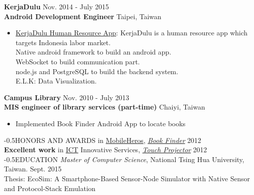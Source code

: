 \documentclass{res}
\makeatletter
\renewcommand{\section}{\@startsection{section}{1}{0mm}
  {-\baselineskip}{0.5\baselineskip}{\bf\leftline}}
\makeatother
\begin{document}
\begin{resume}
	 			{\bf KerjaDulu }                                {\hfill  Nov. 2014 - July 2015}\\
				{\bf Android Development Engineer}			    	 {\hfill Taipei, Taiwan}
		
				\begin{itemize}[leftmargin=*]
					\item {\href{https://www.techinasia.com/kerjadulu-funding-mnc-group}{KerjaDulu Human Resource App}}:
					KerjaDulu is a human resource app which targets Indonesia labor market.\\
					Native android framework to build an android app.\\
					WebSocket to build communication part.\\
					node.js and PostgreSQL to build the backend system.\\
					E.L.K: Data Visualization.
				\end{itemize}
				\vspace{-0.12in}

				{\bf Campus Library}                            {\hfill  Nov. 2010 - July 2013}\\
				{\bf MIS engineer of library services (part-time)}            {\hfill Chaiyi, Taiwan}
				\begin{itemize}[leftmargin=*]
					\item Implemented B​ook Finder Android App to locate books
				\end{itemize}

			\vspace{-0.20in}
			\section{HONORS AND AWARDS}  
			    \vspace{-0.25in}
				 in \href{https://www.mobilehero.com/component/k2/item/209-a2012_11-10.html?Itemid=196}{MobileHeros}, \href{https://www.youtube.com/watch?v=BvLKtrgq_yw}{\sl B​ook Finder} \hfill 2012\\
				{\bf Excellent work} in \href{http://innoserve.tca.org.tw/en/index.aspx}{ICT} Innovative Services, \href{https://www.youtube.com/watch?v=nt4eUAXqXyk}{\sl T​ouch Projector​} \hfill 2012\\  
	
			\vspace{-0.25in}
			\section{EDUCATION}
			\vspace{-0.25in}
				{\sl Master of Computer Science}, National Tsing Hua University, Taiwan. \hfill Sept. 2015\\
				{\footnotesize Thesis: EcoSim: A Smartphone-Based Sensor-Node Simulator with Native Sensor and Protocol-Stack Emulation}


\end{resume}
\end{document}
